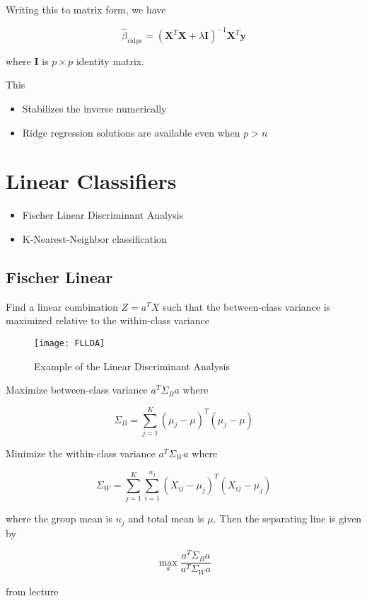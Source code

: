 Writing this to matrix form, we have

\[
    \hat{\beta}_{\text{ridge}} = (\bm{X}^T\bm{X} + \lambda \bm{I})^{-1} \bm{X}^T\bm{y}
\]

where $\bm{I}$ is $p \times p$ identity matrix.

This

\begin{itemize}
  \item Stabilizes the inverse numerically
  \item Ridge regression solutions are available even when $p > n$
\end{itemize}

\section{Linear Classifiers}

\begin{itemize}
  \item Fischer Linear Discriminant Analysis
  \item K-Nearest-Neighbor classification
\end{itemize}

\subsection{Fischer Linear}

Find a linear combination $Z = a^T X$ such that the between-class variance is maximized relative to the within-class variance

\begin{figure}[H]
  \centering
  \texttt{[image: FLLDA]}
  \caption{Example of the Linear Discriminant Analysis}\label{fig:FLLDA}
\end{figure}

Maximize between-class variance $a^T \Sigma_B a$ where

\[
    \Sigma_B = \sum_{j=1}^{K} (\mu_j - \mu)^T(\mu_j - \mu)
\]

Minimize the within-class variance $a^T \Sigma_W a$ where

\[
    \Sigma_W = \sum_{j=1}^{K} \sum_{i=1}^{n_j} (X_{ij} -\mu_j)^T (X_{ij} -\mu_j)
\]

where the group mean is $u_j$ and total mean is $\mu$. Then the separating line is given by

\[
    \max\limits_a \frac{a^T \Sigma_B a}{a^T \Sigma_W a}
\]

from lecture \cite[p.~59]{lecture1}

